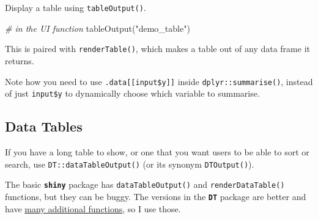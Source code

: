 \documentclass[
  oneside]{book}
\newenvironment{Shaded}{\begin{snugshade}}{\end{snugshade}}
\newcommand{\AttributeTok}[1]{\textcolor[rgb]{0.77,0.63,0.00}{#1}}
\newcommand{\CommentTok}[1]{\textcolor[rgb]{0.56,0.35,0.01}{\textit{#1}}}
\newcommand{\FunctionTok}[1]{\textcolor[rgb]{0.00,0.00,0.00}{#1}}
\newcommand{\NormalTok}[1]{#1}
\newcommand{\OtherTok}[1]{\textcolor[rgb]{0.56,0.35,0.01}{#1}}
\newcommand{\SpecialCharTok}[1]{\textcolor[rgb]{0.00,0.00,0.00}{#1}}
\newcommand{\StringTok}[1]{\textcolor[rgb]{0.31,0.60,0.02}{#1}}
\begin{document}
Display a table using \texttt{tableOutput}\texttt{()}.

\begin{Shaded}
\begin{Highlighting}[]
\CommentTok{\# in the UI function}
\FunctionTok{tableOutput}\NormalTok{(}\StringTok{"demo\_table"}\NormalTok{)}
\end{Highlighting}
\end{Shaded}

This is paired with \texttt{renderTable}\texttt{()}, which makes a table out of any data frame it returns.

\begin{Shaded}
\end{Shaded}

\begin{warning}
Note how you need to use \texttt{.data{[}{[}input\$y{]}{]}} inside \texttt{dplyr::summarise}\texttt{()}, instead of just \texttt{input\$y} to dynamically choose which variable to summarise.

\end{warning}

\hypertarget{data-tables}{%
\subsection{Data Tables}\label{data-tables}}

If you have a long table to show, or one that you want users to be able to sort or search, use \texttt{DT::dataTableOutput}\texttt{()} (or its synonym \texttt{DTOutput}\texttt{()}).

The basic \textbf{\texttt{shiny}} package has \texttt{dataTableOutput}\texttt{()} and \texttt{renderDataTable}\texttt{()} functions, but they can be buggy. The versions in the \textbf{\texttt{DT}} package are better and have \href{https://rstudio.github.io/DT/}{many additional functions}, so I use those.
\end{document}
